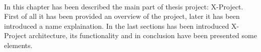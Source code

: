 \paragraph{}
In this chapter has been described the main part of thesis project: X-Project.
First of all it has been provided an overview of the project, later it has been introduced a name explaination. In the last sections has been introduced X-Project architecture, its functionality and in conclusion have been presented some elements.
